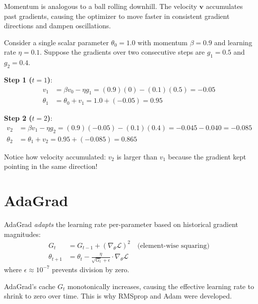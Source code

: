 \documentclass[12pt, a4paper]{report}
\theoremstyle{definition}
\begin{document}
\begin{keyidea}
Momentum is analogous to a ball rolling downhill. The velocity $\mathbf{v}$ accumulates past gradients, causing the optimizer to move faster in consistent gradient directions and dampen oscillations.
\end{keyidea}

\begin{numexample}
Consider a single scalar parameter $\theta_0 = 1.0$ with momentum $\beta = 0.9$ and learning rate $\eta = 0.1$.
Suppose the gradients over two consecutive steps are $g_1 = 0.5$ and $g_2 = 0.4$.

\textbf{Step 1 ($t=1$)}:
\begin{align*}
v_1 &= \beta v_0 - \eta g_1 = (0.9)(0) - (0.1)(0.5) = \boxed{-0.05} \\
\theta_1 &= \theta_0 + v_1 = 1.0 + (-0.05) = \boxed{0.95}
\end{align*}

\textbf{Step 2 ($t=2$)}:
\begin{align*}
v_2 &= \beta v_1 - \eta g_2 = (0.9)(-0.05) - (0.1)(0.4) = -0.045 - 0.040 = \boxed{-0.085} \\
\theta_2 &= \theta_1 + v_2 = 0.95 + (-0.085) = \boxed{0.865}
\end{align*}

Notice how velocity accumulated: $v_2$ is larger than $v_1$ because the gradient kept pointing in the same direction!
\end{numexample}

\section{AdaGrad}

AdaGrad \textit{adapts} the learning rate per-parameter based on historical gradient magnitudes:
\begin{align}
    G_t &= G_{t-1} + (\nabla_\theta \mathcal{L})^2 \quad \text{(element-wise squaring)} \\
    \theta_{t+1} &= \theta_t - \frac{\eta}{\sqrt{G_t} + \epsilon} \cdot \nabla_\theta \mathcal{L}
\end{align}
where $\epsilon \approx 10^{-7}$ prevents division by zero.

\begin{warning}
AdaGrad's cache $G_t$ monotonically increases, causing the effective learning rate to shrink to zero over time. This is why RMSprop and Adam were developed.
\end{warning}
\end{document}
